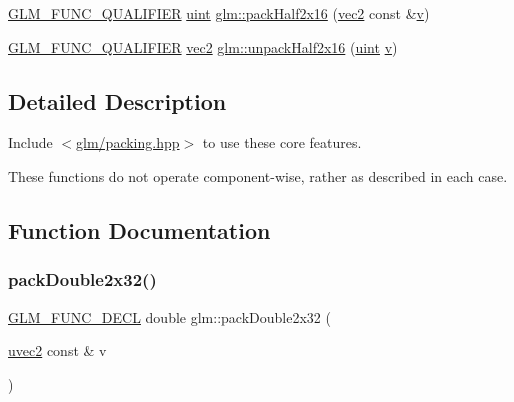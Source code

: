 \begin{DoxyCompactItemize}
\item 
\hyperlink{setup_8hpp_a33fdea6f91c5f834105f7415e2a64407}{G\+L\+M\+\_\+\+F\+U\+N\+C\+\_\+\+Q\+U\+A\+L\+I\+F\+I\+ER} \hyperlink{group__core__precision_ga4fd29415871152bfb5abd588334147c8}{uint} \hyperlink{group__core__func__packing_ga20f134b07db3a3d3a38efb2617388c92}{glm\+::pack\+Half2x16} (\hyperlink{group__core__types_gaa1618f51db67eaa145db101d8c8431d8}{vec2} const \&\hyperlink{_s_d_l__opengl_8h_a10a82eabcb59d2fcd74acee063775f90}{v})
\item 
\hyperlink{setup_8hpp_a33fdea6f91c5f834105f7415e2a64407}{G\+L\+M\+\_\+\+F\+U\+N\+C\+\_\+\+Q\+U\+A\+L\+I\+F\+I\+ER} \hyperlink{group__core__types_gaa1618f51db67eaa145db101d8c8431d8}{vec2} \hyperlink{group__core__func__packing_gaf59b52e6b28da9335322c4ae19b5d745}{glm\+::unpack\+Half2x16} (\hyperlink{group__core__precision_ga4fd29415871152bfb5abd588334147c8}{uint} \hyperlink{_s_d_l__opengl_8h_a10a82eabcb59d2fcd74acee063775f90}{v})
\end{DoxyCompactItemize}


\subsection{Detailed Description}
Include $<$\hyperlink{packing_8hpp}{glm/packing.\+hpp}$>$ to use these core features.

These functions do not operate component-\/wise, rather as described in each case. 

\subsection{Function Documentation}
\mbox{\label{group__core__func__packing_gaa916ca426b2bb0343ba17e3753e245c2}} 
\subsubsection{\texorpdfstring{pack\+Double2x32()}{packDouble2x32()}}
{\footnotesize\ttfamily \hyperlink{setup_8hpp_ab2d052de21a70539923e9bcbf6e83a51}{G\+L\+M\+\_\+\+F\+U\+N\+C\+\_\+\+D\+E\+CL} double glm\+::pack\+Double2x32 (\begin{DoxyParamCaption}\item[{\hyperlink{group__core__types_gafd2041b45eff671aa8899d2c2835eee9}{uvec2} const \&}]{v }\end{DoxyParamCaption})}


